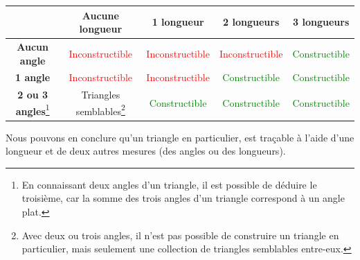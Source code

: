 \documentclass[a4paper]{article}
\begin{document}
			\begin{center}
					\renewcommand{\arraystretch}{1.25}
					\begin{tabular}{|c|c|c|c|c|}
						\hline
									           & \textbf{Aucune longueur}         & \textbf{1 longueur}              & \textbf{2 longueurs}             & \textbf{3 longueurs}             \\
						\hline
						\textbf{Aucun angle}   & \textcolor{Red}{Inconstructible} & \textcolor{Red}{Inconstructible} & \textcolor{Red}{Inconstructible} & \textcolor{Green}{Constructible} \\
						\hline
						\textbf{1 angle}       & \textcolor{Red}{Inconstructible} & \textcolor{Red}{Inconstructible} & \textcolor{Green}{Constructible} & \textcolor{Green}{Constructible} \\
						\hline
						\textbf{2 ou 3 angles}\footnote[2]{
							En connaissant deux angles d'un triangle, 
							il est possible de déduire le troisième, 
							car la somme des trois angles d'un triangle 
							correspond à un angle plat.
											} & Triangles semblables\footnote[3]{
											Avec deux ou trois angles, 
											il n'est pas possible de construire un triangle en particulier,
											mais seulement une collection de triangles semblables entre-eux.
										}& \textcolor{Green}{Constructible} & \textcolor{Green}{Constructible} & \textcolor{Green}{Constructible} \\
						\hline
					\end{tabular}
			\end{center}

			Nous pouvons en conclure qu'un triangle en particulier, 
			est traçable à l'aide d'une longueur et de deux autres mesures 
			(des angles ou des longueurs).
\end{document}
